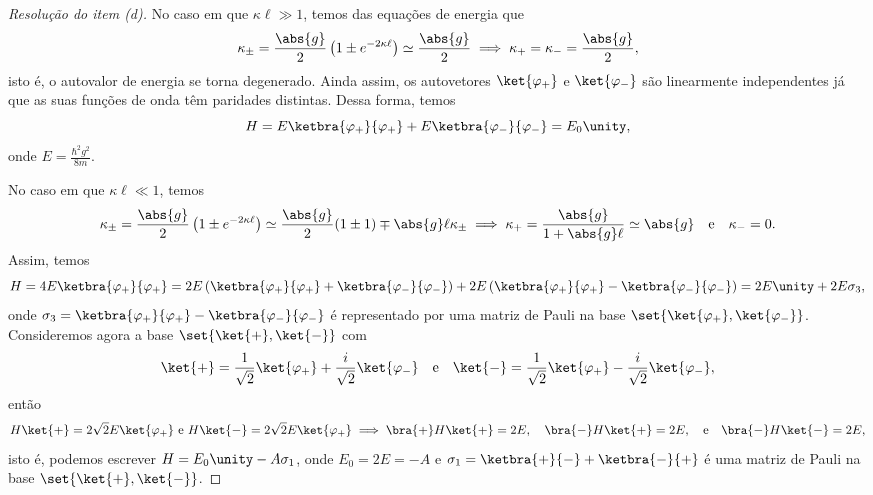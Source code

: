 \begin{proof}[Resolução do item (d)]
    No caso em que \(\kappa \ell \gg 1\), temos das equações de energia que
    \begin{equation*}
        \kappa_\pm = \frac{\abs{g}}{2}\left(1 \pm e^{-2 \kappa \ell}\right) \simeq \frac{\abs{g}}{2} \implies \kappa_+ = \kappa_- = \frac{\abs{g}}{2},
    \end{equation*}
    isto é, o autovalor de energia se torna degenerado. Ainda assim, os autovetores \(\ket{\varphi_+}\) e \(\ket{\varphi_-}\) são linearmente independentes já que as suas funções de onda têm paridades distintas. Dessa forma, temos
    \begin{equation*}
        H = E \ketbra{\varphi_+}{\varphi_+} + E \ketbra{\varphi_-}{\varphi_-} = E_0 \unity,
    \end{equation*}
    onde \(E = \frac{\hbar^2 g^2}{8m}\).

    No caso em que \(\kappa \ell \ll 1\), temos
    \begin{equation*}
        \kappa_\pm = \frac{\abs{g}}{2}\left(1 \pm e^{-2 \kappa \ell}\right) \simeq \frac{\abs{g}}{2}(1 \pm 1)  \mp \abs{g}\ell \kappa_{\pm} \implies \kappa_+ = \frac{\abs{g}}{1 + \abs{g} \ell} \simeq \abs{g}\quad\text{e}\quad\kappa_- = 0.
    \end{equation*}
    Assim, temos
    \begin{equation*}
        H = 4E \ketbra{\varphi_+}{\varphi_+} = 2 E \left(\ketbra{\varphi_+}{\varphi_+} + \ketbra{\varphi_-}{\varphi_-}\right) + 2 E \left(\ketbra{\varphi_+}{\varphi_+} - \ketbra{\varphi_-}{\varphi_-}\right) = 2E \unity + 2 E \sigma_3,
    \end{equation*}
    onde \(\sigma_3 = \ketbra{\varphi_+}{\varphi_+} - \ketbra{\varphi_-}{\varphi_-}\) é representado por uma matriz de Pauli na base \(\set{\ket{\varphi_+}, \ket{\varphi_-}}\). Consideremos agora a base \(\set{\ket{+}, \ket{-}}\) com
    \begin{equation*}
        \ket{+} = \frac{1}{\sqrt{2}} \ket{\varphi_+} + \frac{i}{\sqrt{2}}\ket{\varphi_-}
        \quad\text{e}\quad
        \ket{-} = \frac{1}{\sqrt{2}} \ket{\varphi_+} - \frac{i}{\sqrt{2}}\ket{\varphi_-},
    \end{equation*}
    então
    \begin{equation*}
        H\ket{+} = 2\sqrt{2}E \ket{\varphi_+}\text{ e }
        H\ket{-} = 2\sqrt{2}E \ket{\varphi_+} \implies \bra{+}H\ket{+} = 2E,\quad\bra{-}H\ket{+} = 2E,\quad\text{e}\quad\bra{-}H\ket{-} = 2E,
    \end{equation*}
    isto é, podemos escrever \(H = E_0 \unity - A \sigma_1\), onde \(E_0 = 2E = -A\) e \(\sigma_1= \ketbra{+}{-} + \ketbra{-}{+}\) é uma matriz de Pauli na base \(\set{\ket{+},\ket{-}}\).
\end{proof}
